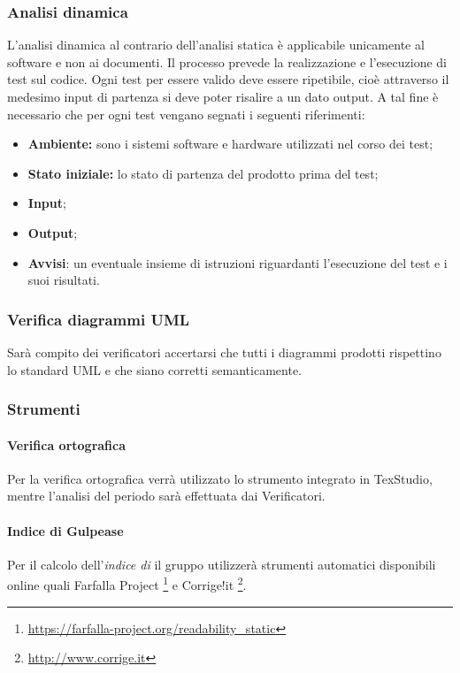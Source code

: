 \subsubsection{Analisi dinamica}
L'analisi dinamica al contrario dell'analisi statica è applicabile unicamente al software e non ai documenti. Il processo prevede la realizzazione e l'esecuzione di test sul codice. Ogni test per essere valido deve essere ripetibile, cioè attraverso il medesimo input di partenza si deve poter risalire a un dato output. A tal fine è necessario che per ogni test vengano segnati i seguenti riferimenti: 
\begin{itemize}
\item \textbf{Ambiente:} sono i sistemi software e hardware utilizzati nel corso dei test;
\item \textbf{Stato iniziale:} lo stato di partenza del prodotto prima del test;
\item \textbf{Input};
\item \textbf{Output};
\item \textbf{Avvisi}: un eventuale insieme di istruzioni riguardanti l'esecuzione del test e i suoi risultati.
\end{itemize}
\subsubsection{Verifica diagrammi UML}
Sarà compito dei verificatori accertarsi che tutti i diagrammi prodotti rispettino lo standard UML e che siano corretti semanticamente.
\subsubsection{Strumenti}
\paragraph{Verifica ortografica}
Per la verifica ortografica verrà utilizzato lo strumento integrato in TexStudio, mentre l'analisi del periodo sarà effettuata dai Verificatori.
\paragraph{Indice di Gulpease}
Per il calcolo dell'\textit{indice di} il gruppo utilizzerà strumenti automatici disponibili online quali Farfalla Project \footnote{\url{https://farfalla-project.org/readability_static}} e Corrige!it \footnote{\url{http://www.corrige.it}}.

